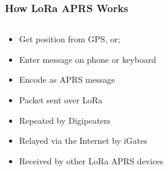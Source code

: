 \documentclass[aspectratio=169]{beamer}
\begin{document}
\begin{frame}[t]
  \frametitle{How LoRa APRS Works}
  \begin{columns}
    \begin{column}{0.66\textwidth}
      \begin{itemize}
        \item Get position from GPS, or;
        \medskip
        \item Enter message on phone or keyboard
        \medskip
        \item Encode as APRS message
        \medskip
        \item Packet sent over LoRa
        \medskip
        \item Repeated by Digipeaters
        \medskip
        \item Relayed via the Internet by iGates
        \medskip
        \item Received by other LoRa APRS devices
      \end{itemize}
    \end{column}
    \begin{column}{0.33\textwidth}
    \end{column}
  \end{columns}
\end{frame}
\end{document}
